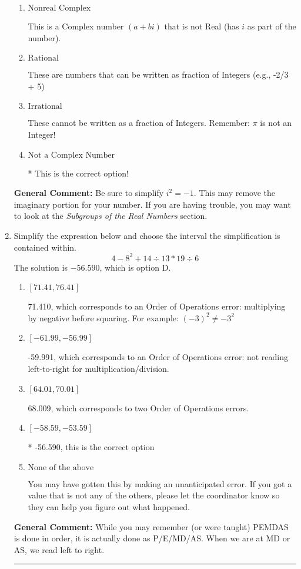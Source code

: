 \documentclass{extbook}[14pt]
\newcommand{\litem}[1]{\item #1

\rule{\textwidth}{0.4pt}}
\begin{document}
\begin{enumerate}
{\begin{enumerate}[label=\Alph*.]
This is a Complex number $(a+bi)$ that \textbf{only} has an imaginary part like $2i$.
\item \( \text{Nonreal Complex} \)

This is a Complex number $(a+bi)$ that is not Real (has $i$ as part of the number).
\item \( \text{Rational} \)

These are numbers that can be written as fraction of Integers (e.g., -2/3 + 5)
\item \( \text{Irrational} \)

These cannot be written as a fraction of Integers. Remember: $\pi$ is not an Integer!
\item \( \text{Not a Complex Number} \)

* This is the correct option!
\end{enumerate}

\textbf{General Comment:} Be sure to simplify $i^2 = -1$. This may remove the imaginary portion for your number. If you are having trouble, you may want to look at the \textit{Subgroups of the Real Numbers} section.
}
\litem{
Simplify the expression below and choose the interval the simplification is contained within.
\[ 4 - 8^2 + 14 \div 13 * 19 \div 6 \]The solution is \( -56.590 \), which is option D.\begin{enumerate}[label=\Alph*.]
\item \( [71.41, 76.41] \)

 71.410, which corresponds to an Order of Operations error: multiplying by negative before squaring. For example: $(-3)^2 \neq -3^2$
\item \( [-61.99, -56.99] \)

 -59.991, which corresponds to an Order of Operations error: not reading left-to-right for multiplication/division.
\item \( [64.01, 70.01] \)

 68.009, which corresponds to two Order of Operations errors.
\item \( [-58.59, -53.59] \)

* -56.590, this is the correct option
\item \( \text{None of the above} \)

 You may have gotten this by making an unanticipated error. If you got a value that is not any of the others, please let the coordinator know so they can help you figure out what happened.
\end{enumerate}

\textbf{General Comment:} While you may remember (or were taught) PEMDAS is done in order, it is actually done as P/E/MD/AS. When we are at MD or AS, we read left to right.
}
\end{enumerate}
\end{document}

